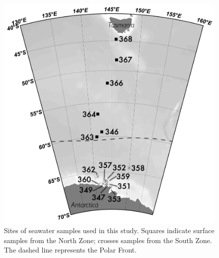 \begin{figure}[!ht]
  \centering
  \includegraphics[width=\textwidth]{../polarfront/samplemap.png}
  \caption[Map showing sites of seawater samples used in the Polar Front study]{Sites of seawater samples used in this study. 
  Squares indicate surface samples from the North Zone; crosses samples from the South Zone. 
  The dashed line represents the Polar Front.}
  \label{fig:samplemap}
\end{figure}
